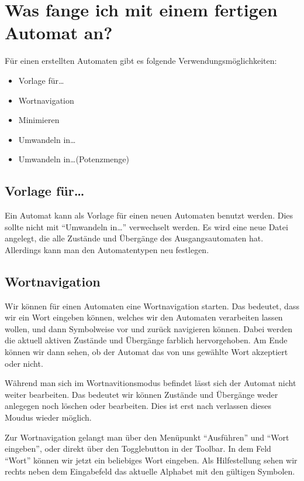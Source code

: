\section{Was fange ich mit einem fertigen Automat an?}

Für einen erstellten Automaten gibt es folgende
Ver\-wen\-dungs\-möglich\-keiten:

\begin{itemize}
  \item Vorlage für\ldots
  \item Wortnavigation
  \item Minimieren
  \item Umwandeln in\ldots
  \item Umwandeln in\ldots (Potenzmenge)
\end{itemize}

\subsection{Vorlage für\ldots}
  
  Ein Automat kann als Vorlage für einen neuen Automaten benutzt werden. Dies
  sollte nicht mit "`Umwandeln in\ldots"' verwechselt werden. Es wird eine neue
  Datei angelegt, die alle Zustände und Übergänge des Ausgangsautomaten hat.
  Allerdings kann man den Automatentypen neu festlegen.
  
\subsection{Wortnavigation}
  
  Wir können für einen Automaten eine Wortnavigation starten. Das bedeutet,
  dass wir ein Wort eingeben können, welches wir den Automaten verarbeiten
  lassen wollen, und dann Symbolweise vor und zurück navigieren können. Dabei
  werden die aktuell aktiven Zustände und Übergänge farblich hervorgehoben. Am
  Ende können wir dann sehen, ob der Automat das von uns gewählte Wort
  akzeptiert oder nicht.\vspace{10pt}
  
  Während man sich im Wortnavitionsmodus
  befindet lässt sich der Automat nicht weiter bearbeiten. Das bedeutet
  wir können Zustände und Übergänge weder anlegegen noch löschen
  oder bearbeiten. Dies ist erst nach verlassen dieses Moudus wieder
  möglich.\vspace{10pt}
  
  Zur Wortnavigation gelangt man über den Menüpunkt "`Ausführen"' und "`Wort
  eingeben"', oder direkt über den Togglebutton in der Toolbar. In dem
  Feld "`Wort"' können wir jetzt ein beliebiges Wort eingeben. Als
  Hilfestellung sehen wir rechts neben dem Eingabefeld das aktuelle Alphabet
  mit den gültigen Symbolen.\vspace{10pt}
  

